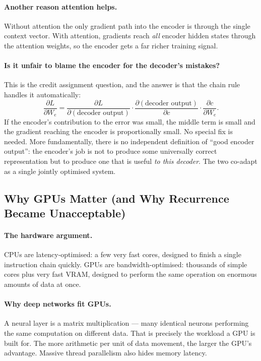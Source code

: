 \documentclass[11pt,a4paper]{article}
\begin{document}
\paragraph{Another reason attention helps.} Without attention the only gradient path into the
encoder is through the single context vector. With attention, gradients reach \emph{all}
encoder hidden states through the attention weights, so the encoder gets a far richer
training signal.

\paragraph{Is it unfair to blame the encoder for the decoder's mistakes?} This is the credit
assignment question, and the answer is that the chain rule handles it automatically:
\[
\frac{\partial L}{\partial W_e}
= \frac{\partial L}{\partial(\text{decoder output})}
\cdot \frac{\partial(\text{decoder output})}{\partial c}
\cdot \frac{\partial c}{\partial W_e}.
\]
If the encoder's contribution to the error was small, the middle term is small and the
gradient reaching the encoder is proportionally small. No special fix is needed. More
fundamentally, there is no independent definition of ``good encoder output'': the encoder's
job is not to produce some universally correct representation but to produce one that is
useful \emph{to this decoder}. The two co-adapt as a single jointly optimised system.

\subsection{Why GPUs Matter (and Why Recurrence Became Unacceptable)}

\paragraph{The hardware argument.} CPUs are latency-optimised: a few very fast cores,
designed to finish a single instruction chain quickly. GPUs are bandwidth-optimised:
thousands of simple cores plus very fast VRAM, designed to perform the same operation on
enormous amounts of data at once.

\paragraph{Why deep networks fit GPUs.} A neural layer is a matrix multiplication --- many
identical neurons performing the same computation on different data. That is precisely the
workload a GPU is built for. The more arithmetic per unit of data movement, the larger the
GPU's advantage. Massive thread parallelism also hides memory latency.
\end{document}
